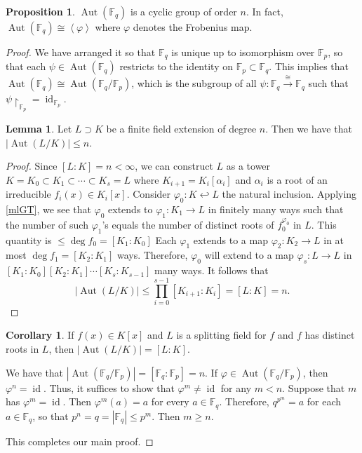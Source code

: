 \documentclass[10pt,letterpaper,cm]{nupset}
\theoremstyle{definition}
\theoremstyle{theorem}
\newtheorem{lemma}[definition]{Lemma}
\newtheorem{prop}[definition]{Proposition}
\newtheorem{corollary}[definition]{Corollary}
\theoremstyle{remark}
\newcommand{\F}{\mathbb F}
\newcommand{\1}{\mathbf{1}}
\newcommand{\0}{\vec 0}
\DeclareMathOperator{\id}{id}
\DeclareMathOperator{\aut}{Aut}
\begin{document}
\begin{prop} 
 $\aut(\F_q)$ is a cyclic group of order $n$. In fact, $\aut(\F_q) \cong \left\langle \varphi \right\rangle$ where $\varphi$ denotes the Frobenius map.
 \end{prop}
\begin{proof}
We have arranged it so that $\F_q$ is unique up to isomorphism over $\F_p$, so that each $\psi \in \aut(\F_q)$ restricts to the identity on $\F_p \subset \F_q$. This implies that $\aut(\F_q) \cong \aut(\F_q/\F_p)$, which is the subgroup of all $\psi : \F_q \overset{\cong}{\longrightarrow} \F_q$ such that $\psi \restriction_{\F_p} = \id_{\F_p}$.
\begin{lemma}
Let $L \supset K$ be a finite field extension of degree $n$. Then we have that $\left\lvert{\aut(L/K)}\right\rvert \leq n$.
\end{lemma}
\begin{proof}
Since $[L:K] = n < \infty$, we can construct $L$ as a tower $K= K_0 \subset K_1 \subset \cdots \subset K_s =L$ where $K_{i+1} = K_i[\alpha_i]$ and $\alpha_i$ is a root of an irreducible $f_i(x) \in K_i[x]$. Consider $\varphi_0 : K \hookleftarrow L$ the natural inclusion. Applying \cref{mlGT}, we see that $\varphi_0$ extends to $\varphi_1 : K_1 \to L$ in finitely many ways such that the number of such $\varphi_1$'s equals the number of distinct roots of $f_0^{\varphi_0}$ in $L$. This quantity is $\leq \deg{f_0} = [K_1 : K_0]$ Each $\varphi_1$ extends to a map $\varphi_2 : K_2 \to L$ in at most $\deg{f_1}= [K_2 : K_1]$ ways. Therefore, $\varphi_0$ will extend to a map $\varphi_s : L \to L$ in $\left[K_1 : K_0\right]\left[K_2 : K_1\right] \cdots \left[K_s : K_{s-1}\right]$ many ways. It follows that $$\left\lvert{\aut(L/K)}\right\rvert \leq \prod_{i=0}^{s-1} [K_{i+1} : K_i] = [L:K] =n.$$ 
\end{proof}

\begin{corollary}
If $f(x) \in K[x]$ and $L$ is a splitting field for $f$ and $f$ has distinct roots in $L$, then $\left\lvert{\aut(L/K)}\right\rvert = \left[L:K\right]$.
\end{corollary}
We have that $\left\lvert{\aut(\F_q/\F_p)}\right\rvert = \left[\F_q : \F_p\right] =n$. 
If $\varphi \in \aut(\F_q/\F_p)$, then $\varphi^n = \id$. Thus, it suffices to show that $\varphi^m \ne \id$ for any $m <n$. Suppose that $m$ has $\varphi^m = \id$. Then $\varphi^m(a) = a$ for every $a\in \F_q$. Therefore, $q^{p^m} = a$ for each $a\in \F_q$, so that $p^n = q = \left\lvert{\F_q}\right\rvert \leq p^m$. Then $m \geq n$.

\medskip

 This completes our main proof.
\end{proof}
\end{document}
